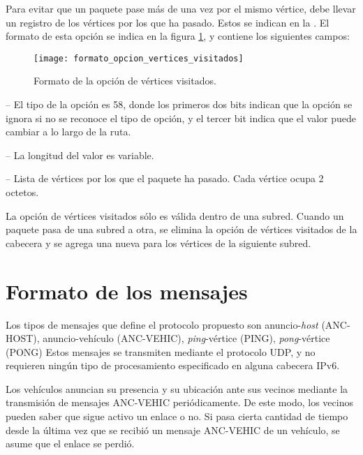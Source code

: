 \label{subsec:opcion_de_vertices_visitados}

Para evitar que un paquete pase más de una vez por el mismo vértice, debe
llevar un registro de los vértices por los que ha pasado. Estos se indican en
la . El formato de esta opción se indica
en la figura \ref{fig:formato_opcion_vertices_visitados}, y contiene los
siguientes campos:

\begin{figure}[th!]
\centering
\texttt{[image: formato\_opcion\_vertices\_visitados]}
\decoRule
\caption[Formato de la opción de vértices visitados]{Formato de la opción de
vértices visitados.}
\label{fig:formato_opcion_vertices_visitados}
\end{figure}

 -- El tipo de la opción es 58, donde los primeros dos
bits indican que la opción se ignora si no se reconoce el tipo de opción, y el
tercer bit indica que el valor puede cambiar a lo largo de la ruta.

 -- La longitud del valor es variable.

 -- Lista de vértices por los
que el paquete ha pasado. Cada vértice ocupa 2 octetos.

La opción de vértices visitados sólo es válida dentro de una subred. Cuando un
paquete pasa de una subred a otra, se elimina la opción de vértices visitados
de la cabecera y se agrega una nueva para los vértices de la siguiente subred.

\section{Formato de los mensajes}

\label{sec:formato_mensajes}

Los tipos de mensajes que define el protocolo propuesto son
anuncio-\textit{host} (ANC-HOST), anuncio-vehículo (ANC-VEHIC),
\textit{ping}-vértice (PING), \textit{pong}-vértice (PONG) Estos mensajes se
transmiten mediante el protocolo UDP, y no requieren ningún tipo de
procesamiento especificado en alguna cabecera IPv6.

Los vehículos anuncian su presencia y su ubicación ante sus vecinos mediante la
transmisión de mensajes ANC-VEHIC periódicamente. De este modo, los vecinos
pueden saber que sigue activo un enlace o no. Si pasa cierta cantidad de
tiempo desde la última vez que se recibió un mensaje ANC-VEHIC de un vehículo,
se asume que el enlace se perdió.

